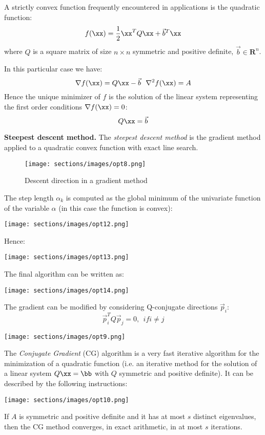 A strictly convex function frequently encountered in applications is the quadratic function:
$$f(\xx)=\frac{1}{2} \xx^T Q \xx + \vec{b} ^T \xx$$
where $Q$ is a square matrix of size $n \times n$ symmetric and positive definite, $\vec{b} \in \mathbf{R}^n$.

In this particular case we have:
$$\nabla f(\xx)=Q \xx- \vec{b} \ \ \nabla^2 f(\xx)=A$$
Hence the unique minimizer of $f$ is the solution of the linear system representing the first order conditions $\nabla f(\xx)=0$:
$$Q \xx= \vec{b}$$

\textbf{Steepest descent method.} The \textit{steepest descent method} is the gradient method applied to a quadratic convex function with exact line search.

\begin{figure}
\texttt{[image: sections/images/opt8.png]}
\caption{Descent direction in a gradient method}
\label{fig:2}\end{figure}

The step length $\alpha_k$ is computed as the global minimum of the univariate function of the variable $\alpha$ (in this case the function is convex):

\texttt{[image: sections/images/opt12.png]}

Hence:

\texttt{[image: sections/images/opt13.png]}

 The final algorithm can be written as:
 
\texttt{[image: sections/images/opt14.png]}


The gradient can be modified by considering Q-conjugate directions $\vec{p}_i$:
$$\vec{p}_i^T Q \vec{p}_j=0, \ \ if i \neq j$$

\texttt{[image: sections/images/opt9.png]}
   
The \textit{Conjugate Gradient } (CG) algorithm is a very fast iterative algorithm for the minimization of a quadratic function (i.e. an iterative method for the solution of a linear system $Q\xx=\bb$ with $Q$ symmetric and positive definite).
It can be described by the following instructions:

\texttt{[image: sections/images/opt10.png]}

\begin{proposition}
If $A$ is symmetric and positive definite and it has at most $s$ distinct eigenvalues, then the CG method converges, in exact arithmetic, in at most $s$ iterations.
\end{proposition}

